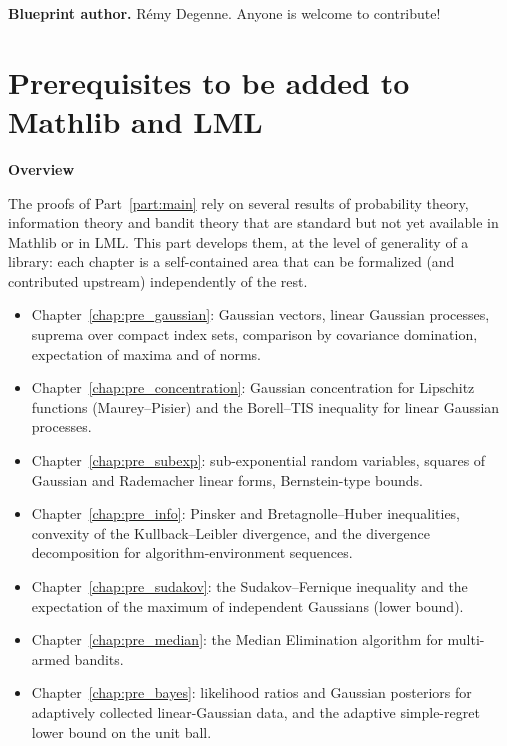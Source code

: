 \textbf{Blueprint author.} Rémy Degenne. Anyone is welcome to contribute!











\part{Prerequisites to be added to Mathlib and LML}
\label{part:prereq}

\textbf{Overview}

The proofs of Part~\ref{part:main} rely on several results of probability theory,
information theory and bandit theory that are standard but not yet available in Mathlib or
in LML. This part develops them, at the level of generality of a library: each chapter is a
self-contained area that can be formalized (and contributed upstream) independently of the
rest.
\begin{itemize}
  \item Chapter~\ref{chap:pre_gaussian}: Gaussian vectors, linear Gaussian processes,
        suprema over compact index sets, comparison by covariance domination, expectation
        of maxima and of norms.
  \item Chapter~\ref{chap:pre_concentration}: Gaussian concentration for Lipschitz
        functions (Maurey--Pisier) and the Borell--TIS inequality for linear Gaussian
        processes.
  \item Chapter~\ref{chap:pre_subexp}: sub-exponential random variables, squares of
        Gaussian and Rademacher linear forms, Bernstein-type bounds.
  \item Chapter~\ref{chap:pre_info}: Pinsker and Bretagnolle--Huber inequalities,
        convexity of the Kullback--Leibler divergence, and the divergence decomposition for
        algorithm-environment sequences.
  \item Chapter~\ref{chap:pre_sudakov}: the Sudakov--Fernique inequality and the
        expectation of the maximum of independent Gaussians (lower bound).
  \item Chapter~\ref{chap:pre_median}: the Median Elimination algorithm for multi-armed
        bandits.
  \item Chapter~\ref{chap:pre_bayes}: likelihood ratios and Gaussian posteriors for
        adaptively collected linear-Gaussian data, and the adaptive simple-regret lower
        bound on the unit ball.
\end{itemize}








